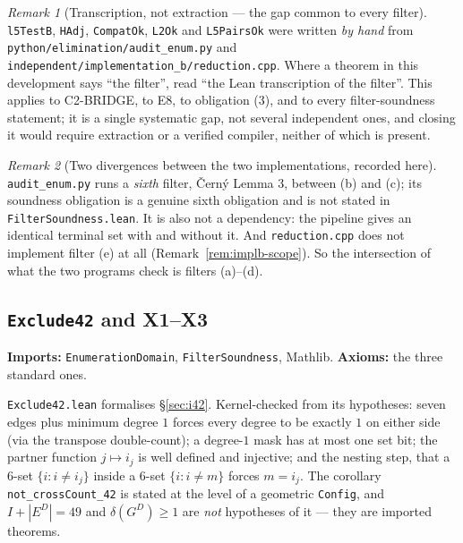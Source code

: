 \documentclass[11pt,a4paper]{article}
\theoremstyle{plain}
\theoremstyle{definition}
\theoremstyle{remark}
\newtheorem*{remark}{Remark}
\newcommand{\GD}{G^{D}}
\newcommand{\ED}{E^{D}}
\begin{document}
\begin{remark}[Transcription, not extraction --- the gap common to every filter]
\texttt{l5TestB}, \texttt{HAdj}, \texttt{CompatOk}, \texttt{L2Ok} and
\texttt{L5PairsOk} were written \emph{by hand} from
\texttt{python/elimination/audit\_enum.py} and
\texttt{independent/implementation\_b/reduction.cpp}. Where a theorem in this
development says ``the filter'', read ``the Lean transcription of the filter''.
This applies to \textsf{C2-BRIDGE}, to \textsf{E8}, to obligation (3), and to
every filter-soundness statement; it is a single systematic gap, not several
independent ones, and closing it would require extraction or a verified
compiler, neither of which is present.
\end{remark}

\begin{remark}[Two divergences between the two implementations, recorded here]
\texttt{audit\_enum.py} runs a \emph{sixth} filter, {\v C}ern{\'y} Lemma 3,
between (b) and (c); its soundness obligation is a genuine sixth obligation and
is not stated in \texttt{FilterSoundness.lean}. It is also not a dependency: the
pipeline gives an identical terminal set with and without it. And
\texttt{reduction.cpp} does not implement filter (e) at all
(Remark~\ref{rem:implb-scope}). So the intersection of what the two programs
check is filters (a)--(d).
\end{remark}

\subsection*{\texttt{Exclude42} and \textsf{X1}--\textsf{X3}}
\textbf{Imports:} \texttt{EnumerationDomain}, \texttt{FilterSoundness}, Mathlib.
\textbf{Axioms:} the three standard ones.

\texttt{Exclude42.lean} formalises \S\ref{sec:i42}. Kernel-checked from its
hypotheses: seven edges plus minimum degree $1$ forces every degree to be
exactly $1$ on either side (via the transpose double-count); a degree-$1$ mask
has at most one set bit; the partner function $j\mapsto i_j$ is well defined and
injective; and the nesting step, that a $6$-set $\{i:i\neq i_j\}$ inside a
$6$-set $\{i:i\neq m\}$ forces $m=i_j$. The corollary
\texttt{not\_crossCount\_42} is stated at the level of a geometric
\texttt{Config}, and $I+|\ED|=49$ and $\delta(\GD)\ge1$ are \emph{not}
hypotheses of it --- they are imported theorems.
\end{document}
